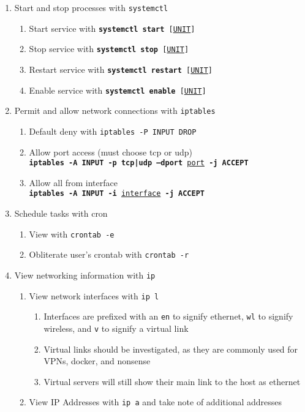 \documentclass[12pt,letterpaper]{article}
\def\code#1{\textcolor{iris}{\texttt{#1}}}
\def\bf#1{\textbf{#1}}
\def\ul#1{\underline{#1}}
\begin{document}
\begin{enumerate}
	\item Start and stop processes with \code{systemctl}
	\begin{enumerate}
		\item Start service with \code{\bf{systemctl start} [\ul{UNIT}]}
		\item Stop service with \code{\bf{systemctl stop} [\ul{UNIT}]}
		\item Restart service with \code{\bf{systemctl restart} [\ul{UNIT}]}
		\item Enable service with \code{\bf{systemctl enable} [\ul{UNIT}]}
	\end{enumerate}
	\item Permit and allow network connections with \code{iptables}
	\begin{enumerate}
		\item Default deny with \code{iptables -P INPUT DROP}
		\item Allow port access (must choose tcp or udp) \\
			\code{\bf{iptables -A INPUT -p tcp|udp --dport} \ul{port} \bf{-j ACCEPT}}
		\item Allow all from interface \\
			\code{\bf{iptables -A INPUT -i} \ul{interface} \bf{-j ACCEPT}}
	\end{enumerate}
	\item Schedule tasks with cron
	\begin{enumerate}
		\item View with \code{crontab -e}
		\item Obliterate user's crontab with \code{crontab -r}
	\end{enumerate}
	\item View networking information with \code{ip}
		\begin{enumerate}
			\item View network interfaces with \code{ip l}
				\begin{enumerate}
					\item Interfaces are prefixed with an \code{en} to signify ethernet, \code{wl} to signify wireless, and \code{v} to signify a virtual link
					\item Virtual links should be investigated, as they are commonly used for VPNs, docker, and nonsense
					\item Virtual servers will still show their main link to the host as ethernet
				\end{enumerate}
			\item View IP Addresses with \code{ip a} and take note of additional addresses
		\end{enumerate}
\end{enumerate}
\end{document}
